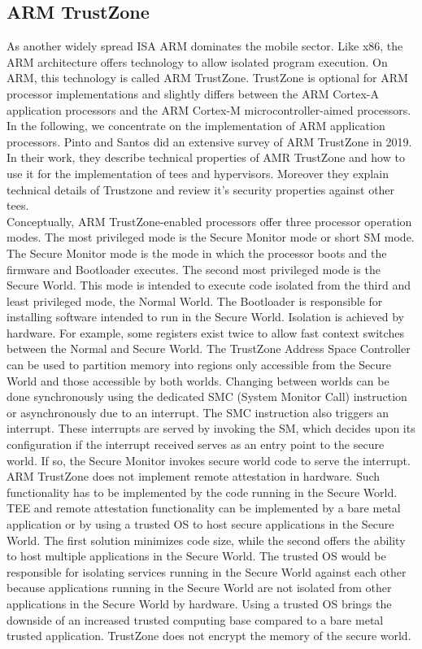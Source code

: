 \subsection{ARM TrustZone}
\label{sec:20:trustzone}
As another widely spread ISA ARM dominates the mobile sector. Like x86, the ARM
architecture offers technology to allow isolated program execution. On ARM, this
technology is called ARM TrustZone. TrustZone is optional for ARM processor
implementations and slightly differs between the ARM Cortex-A application
processors and the ARM Cortex-M microcontroller-aimed processors. In the
following, we concentrate on the implementation of ARM application
processors. Pinto and Santos did an extensive survey of ARM TrustZone in 2019.
In their work, they describe technical properties of AMR TrustZone and how to
use it for the implementation of \gls{tee}s and hypervisors. Moreover they
explain technical details of Trustzone and review it's security properties
against other \gls{tee}s.\cite{pinto_demystifying_2019}\\

Conceptually, ARM TrustZone-enabled processors offer three processor operation
modes. The most privileged mode is the Secure Monitor mode or short SM mode. The
Secure Monitor mode is the mode in which the processor boots and the firmware
and Bootloader executes. The second most privileged mode is the Secure World.
This mode is intended to execute code isolated from the third and least
privileged mode, the Normal World. The Bootloader is responsible for installing
software intended to run in the Secure World. Isolation is achieved by hardware.
For example, some registers exist twice to allow fast context switches between
the Normal and Secure World. The TrustZone Address Space Controller can be used
to partition memory into regions only accessible from the Secure World and those
accessible by both worlds. Changing between worlds can be done synchronously
using the dedicated SMC (System Monitor Call) instruction or asynchronously due
to an interrupt. The SMC instruction also triggers an interrupt. These
interrupts are served by invoking the SM, which decides upon its configuration
if the interrupt received serves as an entry point to the secure world. If so,
the Secure Monitor invokes secure world code to serve the interrupt.\\

ARM TrustZone does not implement remote attestation in hardware. Such
functionality has to be implemented by the code running in the Secure World. TEE
and remote attestation functionality can be implemented by a bare metal
application or by using a trusted OS to host secure applications in the Secure
World. The first solution minimizes code size, while the second offers the
ability to host multiple applications in the Secure World. The trusted OS would
be responsible for isolating services running in the Secure World against each
other because applications running in the Secure World are not isolated from
other applications in the Secure World by hardware. Using a trusted OS brings
the downside of an increased trusted computing base compared to a bare metal
trusted application. TrustZone does not encrypt the memory of the secure
world.\\


